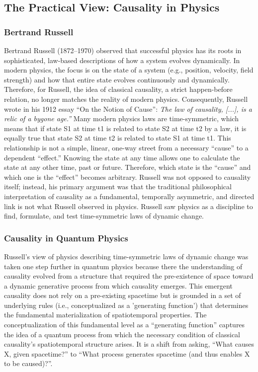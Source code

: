 \subsection{The Practical View: Causality in Physics}
\label{sec:philosophy_physics}

\subsubsection{Bertrand Russell}
\label{sec:history_Russell}

Bertrand Russell (1872--1970) observed that successful physics has its roots in sophisticated, law-based descriptions of how a system evolves dynamically. In modern physics, the focus is on the state of a system (e.g., position, velocity, field strength) and how that entire state evolves continuously and dynamically. Therefore, for Russell, the idea of classical causality, a strict happen-before relation, no longer matches the reality of modern physics. Consequently, Russell wrote in his 1912 essay ``On the Notion of Cause''\cite{RussellOnCause}:  \textit{The law of causality, [...], is a relic of a bygone age.''} 
Many modern physics laws are time-symmetric, which means that if state S1 at time t1 is related to state S2 at time t2 by a law, it is equally true that state S2 at time t2 is related to state S1 at time t1. This relationship is not a simple, linear, one-way street from a necessary ``cause'' to a dependent ``effect.'' Knowing the state at any time allows one to calculate the state at any other time, past or future. Therefore, which state is the ``cause'' and which one is the ``effect'' becomes arbitrary. Russell was not opposed to causality itself; instead, his primary argument was that the traditional philosophical interpretation of causality as a fundamental, temporally asymmetric, and directed link is not what Russell observed in physics. Russell saw physics as a discipline to find, formulate, and test time-symmetric laws of dynamic change. 

\subsubsection{Causality in Quantum Physics}

Russell's view of physics describing time-symmetric laws of dynamic change was taken one step further in quantum physics because there the understanding of causality evolved from a structure that required the pre-existence of space toward a dynamic generative process from which causality emerges\cite{mrini2024indefinitecausalstructurecausal}. This emergent causality does not rely on a pre-existing spacetime but is grounded in a set of underlying rules (i.e., conceptualized as a 'generating function') that determines the fundamental materialization of spatiotemporal properties. The conceptualization of this fundamental level as a ``generating function'' captures the idea of a quantum process from which the necessary condition of classical causality's spatiotemporal structure arises. It is a shift from asking, ``What causes X, given spacetime?'' to ``What process generates spacetime (and thus enables X to be caused)?''.  
 

